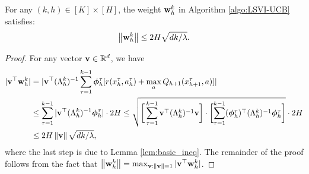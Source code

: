 \begin{lemma}\label{lem:wn_estimate}
For any $(k, h) \in [K] \times [H]$, the weight $\mathbf{w}^k_h$ in Algorithm \ref{algo:LSVI-UCB} satisfies:
\begin{equation*}
\left\|{\mathbf{w}^k_h}\right\| \le 2H \sqrt{dk/\lambda}.
\end{equation*}
\end{lemma}

\begin{proof}
For any vector $\mathbf{v} \in \mathbb{R}^d$, we have
\begin{align*}
|\mathbf{v}^{\top} \mathbf{w}^k_h| & = |\mathbf{v}^{\top} (\Lambda^k_h)^{-1} \sum_{\tau=1}^{k-1} \bm{\phi}^\tau_h [r(x^{\tau}_h, a^{\tau}_h) + \max_a Q_{h+1}(x^{\tau}_{h+1}, a)]|\\
& \le \sum_{\tau = 1}^{k-1}  |\mathbf{v}^{\top} (\Lambda^k_h)^{-1} \bm{\phi}^\tau_h| \cdot 2H 
\le \sqrt{ \bigg[ \sum_{\tau = 1}^{k-1}  \mathbf{v}^{\top} (\Lambda^k_h)^{-1}\mathbf{v}\bigg]  \cdot \biggl [ \sum_{\tau = 1}^{k-1}  (\bm{\phi}^\tau_h)^{\top} (\Lambda^k_h)^{-1}\bm{\phi}^\tau_h\bigg] } \cdot 2H\\
& \le 2H \left\|{\mathbf{v}}\right\|\sqrt{dk/\lambda}, 
\end{align*}
where the last step is due to Lemma \ref{lem:basic_ineq}. The remainder of the proof follows from the fact that 
$\left\|{\mathbf{w}^k_h}\right\| = \max_{\mathbf{v}:\left\|{\mathbf{v}}\right\| = 1} |\mathbf{v}^{\top} \mathbf{w}^k_h|$.
\end{proof}

